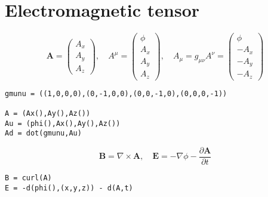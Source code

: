 \documentclass[12pt]{article}
\begin{document}
\section*{Electromagnetic tensor}
\begin{equation*}
\mathbf A=\begin{pmatrix}A_x\\A_y\\A_z\end{pmatrix},\quad
A^\mu=\begin{pmatrix}\phi\\A_x\\A_y\\A_z\end{pmatrix},\quad
A_\mu=g_{\mu\nu}A^\nu=\begin{pmatrix}\phi\\-A_x\\-A_y\\-A_z\end{pmatrix}
\end{equation*}
{\footnotesize
\begin{verbatim}
gmunu = ((1,0,0,0),(0,-1,0,0),(0,0,-1,0),(0,0,0,-1))

A = (Ax(),Ay(),Az())
Au = (phi(),Ax(),Ay(),Az())
Ad = dot(gmunu,Au)
\end{verbatim}
}

\begin{equation*}
\mathbf B=\nabla\times\mathbf A,\quad
\mathbf E=-\nabla\phi-\frac{\partial\mathbf A}{\partial t}
\end{equation*}
{\footnotesize
\begin{verbatim}
B = curl(A)
E = -d(phi(),(x,y,z)) - d(A,t)
\end{verbatim}
}
\end{document}
